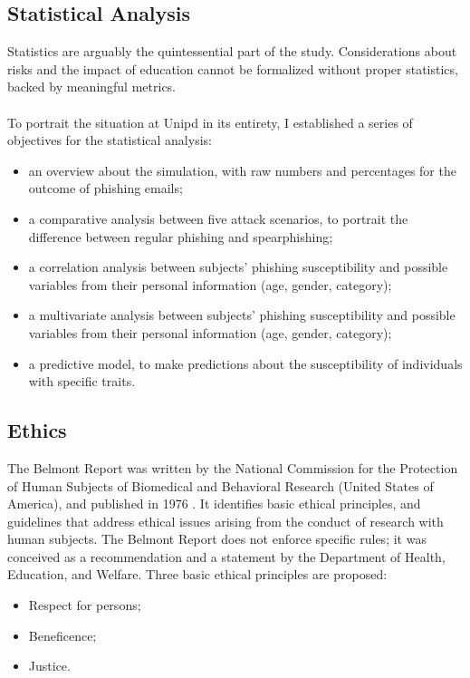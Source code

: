 \documentclass[a4paper]{article}
\begin{document}
\subsection{Statistical Analysis}

Statistics are arguably the quintessential part of the study. Considerations about risks and the impact of education cannot be formalized without proper statistics, backed by meaningful metrics. 
\\  \\
To portrait the situation at Unipd in its entirety, I established a series of objectives for the statistical analysis:

\begin{itemize}
    \item an overview about the simulation, with raw numbers and percentages for the outcome of phishing emails;
    \item a comparative analysis between five attack scenarios, to portrait the difference between regular phishing and spearphishing;
    \item a correlation analysis between subjects' phishing susceptibility and possible variables from their personal information (age, gender, category);
    \item a multivariate analysis between subjects' phishing susceptibility and possible variables from their personal information (age, gender, category);
    \item a predictive model, to make predictions about the susceptibility of individuals with specific traits.
\end{itemize}

\subsection{Ethics}

The Belmont Report was written by the National Commission for the Protection of Human Subjects of Biomedical and Behavioral Research (United States of America), and published in 1976 \cite{lit-other-belmont}. It identifies basic ethical principles, and guidelines that address ethical issues arising from the conduct of research with human subjects. The Belmont Report does not enforce specific rules; it was conceived as a recommendation and a statement by the Department of Health, Education, and Welfare. Three basic ethical principles are proposed:

\begin{itemize}
    \item Respect for persons;
    \item Beneficence;
    \item Justice.
\end{itemize}
\end{document}
